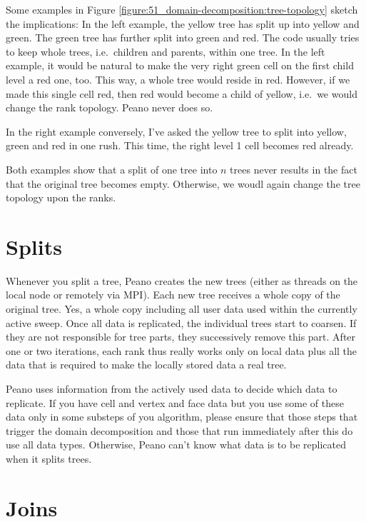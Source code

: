 Some examples in Figure \ref{figure:51_domain-decomposition:tree-topology}
sketch the implications:
In the left example, the yellow tree has split up into yellow and green. The
green tree has further split into green and red.
The code usually tries to keep whole trees, i.e.~children and parents, within
one tree.
In the left example, it would be natural to make the very right green cell on
the first child level a red one, too.
This way, a whole tree would reside in red.
However, if we made this single cell red, then red would become a child of
yellow, i.e.~we would change the rank topology.
Peano never does so.

In the right example conversely, I've asked the yellow tree to split into
yellow, green and red in one rush. 
This time, the right level 1 cell becomes red already. 

Both examples show that a split of one tree into $n$ trees never
results in the fact that the original tree becomes empty.
Otherwise, we woudl again change the tree topology upon the ranks.


\section{Splits}

Whenever you split a tree, Peano creates the new trees (either as threads on
the local node or remotely via MPI). 
Each new tree receives a whole copy of the original tree. 
Yes, a whole copy including all user data used within the currently active
sweep.
Once all data is replicated, the individual trees start to coarsen.
If they are not responsible for tree parts, they successively remove this part. 
After one or two iterations, each rank thus really works only on local data plus
all the data that is required to make the locally stored data a real tree.


\begin{remark}
 Peano uses information from the actively used data to decide which data to
 replicate.
 If you have cell and vertex and face data but you use some of these data only
 in some substeps of you algorithm, please ensure that those steps that trigger
 the domain decomposition and those that run immediately after this do use all
 data types.
 Otherwise, Peano can't know what data is to be replicated when it splits trees.
\end{remark}


\section{Joins}

